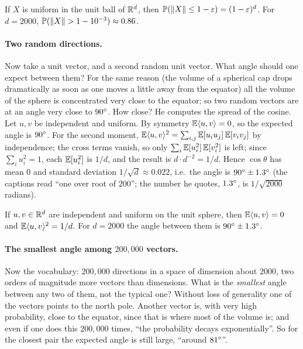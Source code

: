 \begin{claim}\label{cl:L8-ball}
If $X$ is uniform in the unit ball of $\mathbb{R}^{d}$, then $\mathbb{P}(\left\lVert X\right\rVert\le1-\varepsilon)=(1-\varepsilon)^{d}$. For $d=2000$, $\mathbb{P}(\left\lVert X\right\rVert>1-10^{-3})\approx0.86$.
\end{claim}

\paragraph{Two random directions.}
Now take a unit vector, and a second random unit vector. What angle should one expect between them? For the same reason (the volume of a spherical cap drops dramatically as soon as one moves a little away from the equator) all the volume of the sphere is concentrated very close to the equator; so two random vectors are at an angle very close to $90^{\circ}$. How close? He computes the spread of the cosine. Let $u,v$ be independent and uniform. By symmetry $\mathbb{E}\langle u,v\rangle=0$, so the expected angle is $90^{\circ}$. For the second moment, $\mathbb{E}\langle u,v\rangle^2=\sum_{i,j}\mathbb{E}[u_iu_j]\,\mathbb{E}[v_iv_j]$ by independence; the cross terms vanish, so only $\sum_i\mathbb{E}[u_i^2]\,\mathbb{E}[v_i^2]$ is left; since $\sum_iu_i^2=1$, each $\mathbb{E}[u_i^2]$ is $1/d$, and the result is $d\cdot d^{-2}=1/d$. Hence $\cos\theta$ has mean $0$ and standard deviation $1/\sqrt d\approx0.022$, i.e.\ the angle is $90^{\circ}\pm1.3^{\circ}$ (the captions read ``one over root of $200$''\flag; the number he quotes, $1.3^{\circ}$, is $1/\sqrt{2000}$ radians).

\begin{claim}\label{cl:L8-orth}
If $u,v\in\mathbb{R}^{d}$ are independent and uniform on the unit sphere, then $\mathbb{E}\langle u,v\rangle=0$ and $\mathbb{E}\langle u,v\rangle^{2}=1/d$. For $d=2000$ the angle between them is $90^{\circ}\pm1.3^{\circ}$.
\end{claim}

\paragraph{The smallest angle among $200{,}000$ vectors.}
Now the vocabulary: $200{,}000$ directions in a space of dimension about $2000$, two orders of magnitude more vectors than dimensions. What is the \emph{smallest} angle between any two of them, not the typical one? Without loss of generality one of the vectors points to the north pole. Another vector is, with very high probability, close to the equator, since that is where most of the volume is; and even if one does this $200{,}000$ times, ``the probability decays exponentially''. So for the closest pair the expected angle is still large, ``around $81^{\circ}$''.

